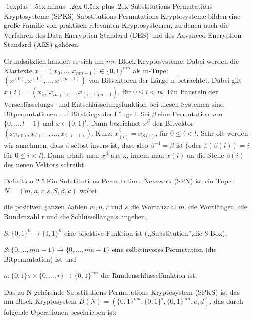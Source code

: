 \documentclass[a4paper]{article}
\makeatletter
\renewcommand{\subsection}{\@startsection{subsection}{2}{0mm}%
 {-1explus -.5ex minus -.2ex}%
 {0.5ex plus .2ex}%
 {\normalfont\normalsize\bfseries}}
\makeatother
\begin{document}
\begin{multicols}{3}
    \subsection{Substitutions-Permutations-Kryptosysteme (SPKS)}
    Substitutions-Permutations-Kryptosysteme bilden eine große Familie von praktisch relevanten Kryptosystemen, zu denen auch die Verfahren des Data Encryption Standard (DES) und des Advanced Encryption Standard (AES) gehören.

    Grundsätzlich handelt es sich um $mn$-Block-Kryptosysteme. Dabei werden die Klartexte $x=(x_0,...,x_{mn-1})\in\{ 0,1\}^{mn}$ als m-Tupel $(x^{(0)},x^{(1)},...,x^{(m-1)})$ von Bitvektoren der Länge n betrachtet. Dabei gilt $x(i)=(x_{in},x_{in+1},...,x_{(i+1)n-1})$, für $0\leq i<m$.
    Ein Baustein der Verschlüsselungs- und Entschlüsselungsfunktion bei diesen Systemen sind Bitpermutationen auf Bitstrings der Länge l: Sei $\beta$ eine Permutation von $\{0,...,l-1\}$ und $x\in\{0,1\}^l$. Dann bezeichnet $x^{\beta}$ den Bitvektor $(x_{{\beta}(0)},x_{{\beta}(1)},...,x_{{\beta}(l-1)})$. Kurz: $x^{\beta}_{(i)}=x_{{\beta}(i)}$, für $0\leq i<l$.
    Sehr oft werden wir annehmen, dass $\beta$ selbst invers ist, dass also ${\beta}^{-1}=\beta$ ist (oder ${\beta}({\beta}(i))=i$ für $0\leq i<l$). Dann erhält man $x^{\beta}$ aus x, indem man $x(i)$ an die Stelle ${\beta}(i)$ des neuen Vektors schreibt.

    Definition 2.5 Ein Substitutions-Permutations-Netzwerk (SPN) ist ein Tupel $N=(m,n,r,s,S,\beta,\kappa)$ wobei
    \begin{itemize*}
        \item die positiven ganzen Zahlen $m,n,r$ und $s$ die Wortanzahl $m$, die Wortlängen, die Rundenzahl r und die Schlüssellänge s angeben,
        \item $S:\{0,1\}^n\rightarrow\{0,1\}^n$ eine bijektive Funktion ist (,,Substitution'',die S-Box),
        \item ${\beta}:\{0,...,mn-1\}\rightarrow\{0,...,mn-1\}$ eine selbstinverse Permutation (die Bitpermutation) ist und
        \item $\kappa :\{0,1\}s\times\{0,...,r\}\rightarrow\{0,1\}^{mn}$ die Rundenschlüsselfunktion ist.
    \end{itemize*}

    Das zu N gehörende Substitutions-Permutations-Kryptosystem (SPKS) ist das mn-Block-Kryptosystem $B(N)=(\{0,1\}^{mn},\{0,1\}^s,\{0,1\}^{mn},e,d)$, das durch folgende Operationen beschrieben ist:


\end{multicols}
\end{document}
